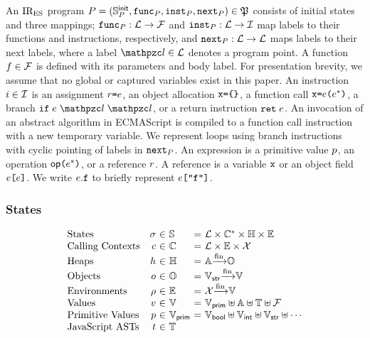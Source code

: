 An $\text{IR}_\text{ES}$ program $P = (\mathbb{S}^{\textsf{init}}_{P}, \texttt{func}_{P},
\texttt{inst}_{P}, \texttt{next}_{P}) \in \mathfrak{P} $ consists of initial states and
three mappings; $\texttt{func}_{P}: \mathcal{L} \rightarrow \mathcal{F}$ and
$\texttt{inst}_{P}: \mathcal{L} \rightarrow \mathcal{I}$ map labels to their functions
and instructions, respectively, and $\texttt{next}_{P}: \mathcal{L} \rightarrow
\mathcal{L}$ maps labels to their next labels, where a label $\lab \in \labset$
denotes a program point.  A function $f \in \mathcal{F}$ is defined with its
parameters and body label.  For presentation brevity, we assume that no global
or captured variables exist in this paper.  An instruction $i \in \mathcal{I}$
is an assignment $r \texttt{=} e$, an object allocation $\texttt{x} \texttt{=} \texttt{\{}
\texttt{\}}$, a function call $\texttt{x} \texttt{=} e \texttt{(} e^* \texttt{)}$, a branch $\kwif
\; \expr \; \lab \; \lab$, or a return instruction $\texttt{ret} \; e$.  An
invocation of an abstract algorithm in ECMAScript is compiled to a function call
instruction with a new temporary variable.  We represent loops using branch
instructions with cyclic pointing of labels in $\texttt{next}_{P}$.  An expression
is a primitive value $p$, an operation $\textsf{op} \texttt{(} e^* \texttt{)}$, or a
reference $r$.  A reference is a variable $\texttt{x}$ or an object field $e
\texttt{[} e \texttt{]}$.  We write $e.\texttt{f}$ to briefly represent $e \texttt{[}
\texttt{"f"} \texttt{]}$.


\subsubsection{States}

\[
  \begin{array}{lr@{~}c@{~}l@{~}c@{~}l}
    \text{States} & \st &\in& \stset &=&
    \labset \times \ctxtset^* \times \heapset \times \envset\\

    \text{Calling Contexts} & \ctxt &\in& \ctxtset &=&
    \labset \times \envset \times \varset\\

    \text{Heaps} & \heap &\in& \heapset &=&
    \addrset \finmap \objset\\

    \text{Objects} & \obj &\in& \objset &=&
    \strset \finmap \valset\\

    \text{Environments} & \env &\in& \envset &=&
    \varset \finmap \valset\\

    \text{Values} & \val &\in& \valset &=&
    \pvalset \uplus \addrset \uplus \treeset \uplus \funcset\\

    \text{Primitive Values} & \pval &\in& \pvalset &=&
    \boolset \uplus \intset \uplus \strset \uplus \cdots\\

    \text{JavaScript ASTs} & \tree &\in& \treeset\\
  \end{array}
\]

